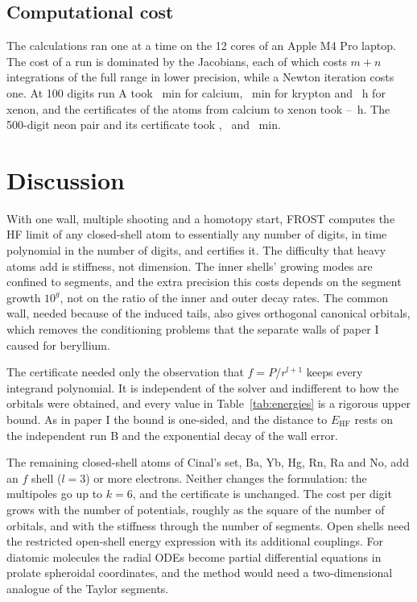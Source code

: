 \documentclass[aps,pra,reprint,superscriptaddress,amsmath,amssymb,longbibliography]{revtex4-2}
\newcommand{\EHF}{E_\mathrm{HF}}
\begin{document}
\subsection{Computational cost}

The calculations ran one at a time on the 12 cores of an Apple M4 Pro laptop. The cost of a run is dominated by the Jacobians, each of which costs $m+n$ integrations of the full range in lower precision, while a Newton iteration costs one. At 100 digits run A took \CaTimeA~min for calcium, \KrTimeA~min for krypton and \XeTimeA~h for xenon, and the certificates of the atoms from calcium to xenon took \CertMinH--\CertMaxH~h. The 500-digit neon pair and its certificate took \NeTimeA, \NeTimeB\ and \NeCertTime~min.

\section{Discussion}

With one wall, multiple shooting and a homotopy start, FROST computes the HF limit of any closed-shell atom to essentially any number of digits, in time polynomial in the number of digits, and certifies it. The difficulty that heavy atoms add is stiffness, not dimension. The inner shells' growing modes are confined to segments, and the extra precision this costs depends on the segment growth $10^g$, not on the ratio of the inner and outer decay rates. The common wall, needed because of the induced tails, also gives orthogonal canonical orbitals, which removes the conditioning problems that the separate walls of paper I caused for beryllium.

The certificate needed only the observation that $f=P/r^{l+1}$ keeps every integrand polynomial. It is independent of the solver and indifferent to how the orbitals were obtained, and every value in Table~\ref{tab:energies} is a rigorous upper bound. As in paper I the bound is one-sided, and the distance to $\EHF$ rests on the independent run B and the exponential decay of the wall error.

The remaining closed-shell atoms of Cinal's set, Ba, Yb, Hg, Rn, Ra and No, add an $f$ shell ($l=3$) or more electrons. Neither changes the formulation: the multipoles go up to $k=6$, and the certificate is unchanged. The cost per digit grows with the number of potentials, roughly as the square of the number of orbitals, and with the stiffness through the number of segments. Open shells need the restricted open-shell energy expression with its additional couplings. For diatomic molecules the radial ODEs become partial differential equations in prolate spheroidal coordinates, and the method would need a two-dimensional analogue of the Taylor segments.
\end{document}
